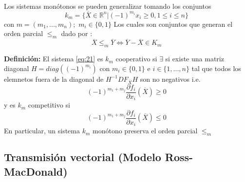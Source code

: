 \documentclass[10pt,oneside]{article}
\theoremstyle{definition}
\begin{document}
\begin{multicols}{2}
    Los sistemas monótonos se pueden generalizar tomando los conjuntos $$k_m=\{\overline{X}\in \mathbb{R}^n|(-1)^{m_i}x_i\geq 0, 1\leq i\leq n\}$$ con $m=(m_1,...,m_n);$ $m_i\in \{0,1\}$ Los cuales son conjuntos que generan el orden parcial $\leq_m$ dado por : $$ \overline{X}\leq_m\overline{Y}\Leftrightarrow \overline{Y}-\overline{X}\in K_m$$

    \textbf{Definición:} El sistema \ref{eq:21} es $k_m$ cooperativo si $\exists$ si existe una matriz diagonal $H=diag\left((-1)^{m_i}\right)$ con $m_i\in \{0,1\}$ e $i \in \{1,...,n\}$ tal que todos los elemnetos fuera de la diagonal de $H^{-1}DF_{\overline{X}}H$ son no negativos i.e. $$(-1)^{m_1+m_j}\frac{\partial f_i}{\partial x_i}(\overline{X})\geq0$$ y es $k_m$ competitivo si $$(-1)^{m_1+m_j}\frac{\partial f_i}{\partial x_i}(\overline{X})\leq0$$ En particular, un sistema $k_m$ monótono preserva el orden parcial $\leq_m$

    
    \subsection{Transmisión vectorial (Modelo Ross-MacDonald)}


\end{multicols}
\end{document}
